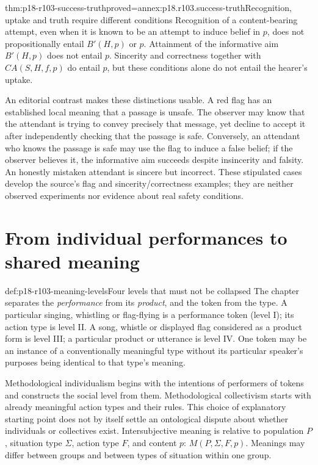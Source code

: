 \begin{hbtheorem}{thm:p18-r103-success-truth}{proved=annex:p18.r103.success-truth}{Recognition, uptake and truth require different conditions}
Recognition of a content-bearing attempt, even when it is known to be an
attempt to induce belief in \(p\), does not propositionally entail
\(B'(H,p)\) or \(p\). Attainment of the informative aim
\(B'(H,p)\) does not entail \(p\). Sincerity and correctness together
with \(CA(S,H,f,p)\) do entail \(p\), but these conditions alone
do not entail the hearer's uptake.
\end{hbtheorem}

An editorial contrast makes these distinctions usable. A red flag has an
established local meaning that a passage is unsafe. The observer may know
that the attendant is trying to convey precisely that message, yet decline
to accept it after independently checking that the passage is safe.
Conversely, an attendant who knows the passage is safe may use the flag
to induce a false belief; if the observer believes it, the informative aim
succeeds despite insincerity and falsity. An honestly mistaken attendant
is sincere but incorrect. These stipulated cases develop the source's flag
and sincerity/correctness examples; they are neither observed experiments
nor evidence about real safety conditions.

\section{From individual performances to shared meaning}

\begin{hbdefinition}{def:p18-r103-meaning-levels}{Four levels that must not be collapsed}
The chapter separates the \emph{performance} from its \emph{product},
and the token from the type. A particular singing, whistling or flag-flying
is a performance token (level I); its action type is level II. A song,
whistle or displayed flag considered as a product form is level III;
a particular product or utterance is level IV. One token may be an
instance of a conventionally meaningful type without its particular
speaker's purposes being identical to that type's meaning.
\cite[pp.~603--605]{Meggle2021RationalityCommunication}
\end{hbdefinition}

Methodological individualism begins with the intentions of performers
of tokens and constructs the social level from them. Methodological
collectivism starts with already meaningful action types and their rules.
This choice of explanatory starting point does not by itself settle an
ontological dispute about whether individuals or collectives exist.
Intersubjective meaning is relative to population \(P\), situation
type \(\Sigma\), action type \(F\), and content \(p\):
\(M(P,\Sigma,F,p)\). Meanings may differ between groups and between
types of situation within one group.

